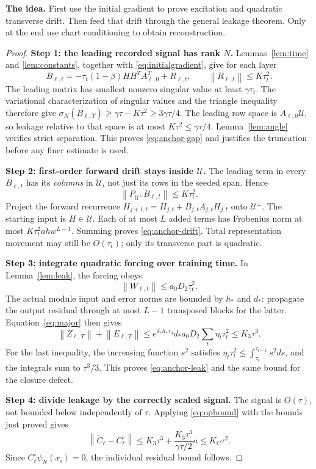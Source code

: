 \documentclass[12pt,a4paper]{article}
\theoremstyle{readable}
\theoremstyle{definition}\newtheorem{example}[theorem]{Example}
\newcommand{\norm}[1]{\left\|#1\right\|}
\newcommand{\idea}[1]{\par\textbf{The idea.} #1\par}
\begin{document}
\idea{First use the initial gradient to prove excitation and quadratic transverse drift. Then feed that drift through the general leakage theorem. Only at the end use chart conditioning to obtain reconstruction.}
\begin{proof}
\textbf{Step 1: the leading recorded signal has rank \(N\).} Lemmas~\ref{lem:time} and \ref{lem:constants}, together with \eqref{eq:initialgradient}, give for each layer
\[
B_{\ell,t}=-\tau_t(1-\beta)HH^TA_{\ell,0}^T+R_{\ell,t},
\qquad \norm{R_{\ell,t}}\le K\tau_t^2.
\]
The leading matrix has smallest nonzero singular value at least \(\gamma\tau_t\). The variational characterization of singular values and the triangle inequality therefore give
\(\sigma_N(B_{\ell,T})\ge\gamma\tau-K\tau^2\ge3\gamma\tau/4\).
The leading row space is \(A_{\ell,0}\mathcal U\), so leakage relative to that space is at most \(K\tau^2\le\gamma\tau/4\). Lemma~\ref{lem:angle} verifies strict separation. This proves \eqref{eq:anchor-gap} and justifies the truncation before any finer estimate is used.

\textbf{Step 2: first-order forward drift stays inside \(\mathcal U\).} The leading term in every \(B_{\ell,t}\) has its \emph{columns} in \(\mathcal U\), not just its rows in the seeded span. Hence
\[
\norm{P_{\mathcal U^\perp}B_{\ell,t}}\le K\tau_t^2.
\]
Project the forward recurrence
\(H_{j+1,t}=H_{j,t}+B_{j,t}A_{j,t}H_{j,t}\)
onto \(\mathcal U^\perp\). The starting input is \(H\in\mathcal U\). Each of at most \(L\) added terms has Frobenius norm at most \(K\tau_t^2 a h w^{L-1}\). Summing proves \eqref{eq:anchor-drift}. Total representation movement may still be \(O(\tau_t)\); only its transverse part is quadratic.

\textbf{Step 3: integrate quadratic forcing over training time.} In Lemma~\ref{lem:leak}, the forcing obeys
\[
\norm{W_{\ell,t}}\le a_0D_2\tau_t^2.
\]
The actual module input and error norms are bounded by \(h_*\) and \(d_*\): propagate the output residual through at most \(L-1\) transposed blocks for the latter. Equation~\eqref{eq:major} then gives
\[
\norm{Z_{\ell,T}}+\norm{E_{\ell,T}}
\le e^{d_*h_*\tau_0}d_*a_0D_2\sum_t\eta_t\tau_t^2
\le K_3\tau^3.
\]
For the last inequality, the increasing function \(s^2\) satisfies
\(\eta_t\tau_t^2\le\int_{\tau_t}^{\tau_{t+1}}s^2ds\), and the integrals sum to \(\tau^3/3\). This proves \eqref{eq:anchor-leak} and the same bound for the closure defect.

\textbf{Step 4: divide leakage by the correctly scaled signal.} The signal is \(O(\tau)\), not bounded below independently of \(\tau\). Applying \eqref{eq:opbound} with the bounds just proved gives
\[
\norm{\widetilde C_\ell-C_\ell^\circ}
\le K_3\tau^3+\frac{K_3\tau^3}{\gamma\tau/2}a
\le K_C\tau^2.
\]
Since \(C_\ell^\circ\psi_N(x_i)=0\), the individual residual bound follows.


\end{proof}
\end{document}
